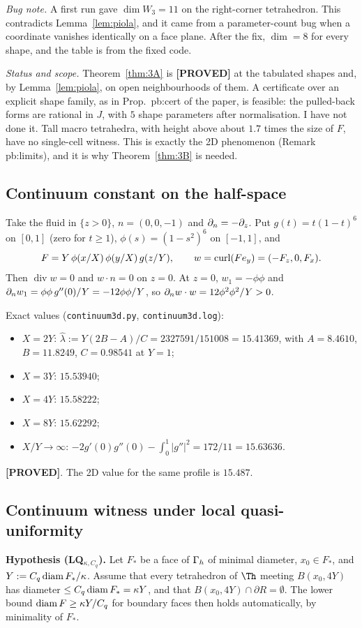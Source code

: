 \documentclass[11pt]{article}
\theoremstyle{remark}\newtheorem{remark}[theorem]{Remark}
\newcommand{\lab}[1]{\textbf{[#1]}}
\begin{document}
\emph{Bug note.} A first run gave $\dim W_3=11$ on the right-corner tetrahedron. This contradicts Lemma~\ref{lem:piola}, and it came from a parameter-count bug when a coordinate vanishes identically on a face plane. After the fix, $\dim=8$ for every shape, and the table is from the fixed code.

\emph{Status and scope.} Theorem~\ref{thm:3A} is \lab{PROVED} at the tabulated shapes and, by Lemma~\ref{lem:piola}, on open neighbourhoods of them. A certificate over an explicit shape family, as in Prop.~pb:cert of the paper, is feasible: the pulled-back forms are rational in $J$, with $5$ shape parameters after normalisation. I have not done it. Tall macro tetrahedra, with height above about $1.7$ times the size of $F$, have no single-cell witness. This is exactly the 2D phenomenon (Remark pb:limits), and it is why Theorem~\ref{thm:3B} is needed.

\subsection{Continuum constant on the half-space}
Take the fluid in $\{z>0\}$, $n=(0,0,-1)$ and $\partial_n=-\partial_z$. Put $g(t)=t(1-t)^6$ on $[0,1]$ (zero for $t\ge1$), $\phi(s)=(1-s^2)^6$ on $[-1,1]$, and
\[F=Y\,\phi(x/X)\,\phi(y/X)\,g(z/Y),\qquad w=\operatorname{curl}(F e_y)=(-F_z,0,F_x).\]
Then $\operatorname{div}w=0$ and $w\cdot n=0$ on $z=0$. At $z=0$, $w_1=-\phi\phi$ and $\partial_n w_1=\phi\phi\,g''(0)/Y=-12\phi\phi/Y$, so $\partial_n w\cdot w=12\phi^2\phi^2/Y>0$.

Exact values (\texttt{continuum3d.py}, \texttt{continuum3d.log}):
\begin{itemize}
\item $X=2Y$: $\hat\lambda:=Y(2B-A)/C=2327591/151008=15.41369$, with $A=8.4610$, $B=11.8249$, $C=0.98541$ at $Y=1$;
\item $X=3Y$: $15.53940$;
\item $X=4Y$: $15.58222$;
\item $X=8Y$: $15.62292$;
\item $X/Y\to\infty$: $-2g'(0)g''(0)-\int_0^1|g''|^2=172/11=15.63636$.
\end{itemize}
\lab{PROVED}. The 2D value for the same profile is $15.487$.

\subsection{Continuum witness under local quasi-uniformity}
\textbf{Hypothesis (LQ$_{\kappa,C_q}$).} Let $F_\ast$ be a face of $\Gamma_h$ of minimal diameter, $x_0\in F_\ast$, and $Y:=C_q\operatorname{diam} F_\ast/\kappa$. Assume that every tetrahedron of $\Th$ meeting $B(x_0,4Y)$ has diameter $\le C_q\operatorname{diam} F_\ast=\kappa Y$, and that $B(x_0,4Y)\cap\partial R=\emptyset$. The lower bound $\operatorname{diam} F\ge\kappa Y/C_q$ for boundary faces then holds automatically, by minimality of $F_\ast$.
\end{document}

